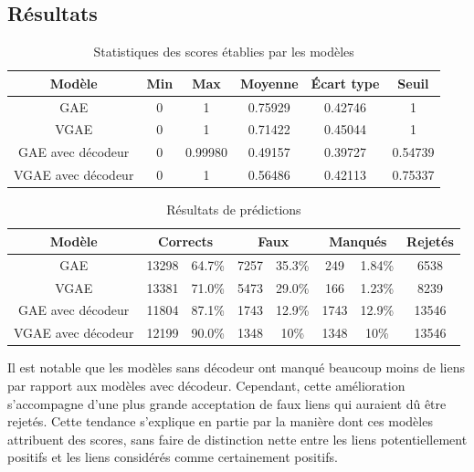 \documentclass{article}
\begin{document}
\subsection{Résultats}

\begin{table}[H]
    \centering
    \begin{tabular}{|c|c|c|c|c|c|}
        \hline
        Modèle & Min & Max & Moyenne & Écart type & Seuil\\
        \hline
        GAE & 0 & 1 & 0.75929 & 0.42746 & 1\\
        VGAE & 0 & 1 & 0.71422 & 0.45044 & 1\\
        GAE avec décodeur & 0 & 0.99980 & 0.49157 & 0.39727 & 0.54739\\
        VGAE avec décodeur & 0 & 1 & 0.56486 & 0.42113 & 0.75337\\
        \hline
    \end{tabular}
    \caption{Statistiques des scores établies par les modèles}
    \label{tab:statistiques_scores}
\end{table}

\begin{table}[H]
    \centering
    \begin{tabular}{|c|c|c|c|c|c|c|c|}
        \hline
        Modèle & \multicolumn{2}{c|}{Corrects} & \multicolumn{2}{c|}{Faux} & \multicolumn{2}{c|}{Manqués} & Rejetés\\
        \hline
        GAE & 13298 & 64.7\% & 7257 & 35.3\% & 249 & 1.84\% & 6538\\
        VGAE & 13381 & 71.0\% & 5473 & 29.0\% & 166 & 1.23\% & 8239\\
        GAE avec décodeur & 11804 & 87.1\% & 1743 & 12.9\% & 1743 & 12.9\% & 13546\\
        VGAE avec décodeur & 12199 & 90.0\% & 1348 & 10\% & 1348 & 10\% & 13546\\
         \hline
    \end{tabular}
    \caption{Résultats de prédictions}
    \label{tab:resultats_reconstruction}
\end{table}

Il est notable que les modèles sans décodeur ont manqué beaucoup moins de liens par rapport aux modèles avec décodeur. Cependant, cette amélioration s'accompagne d'une plus grande acceptation de faux liens qui auraient dû être rejetés. Cette tendance s'explique en partie par la manière dont ces modèles attribuent des scores, sans faire de distinction nette entre les liens potentiellement positifs et les liens considérés comme certainement positifs.
\end{document}
